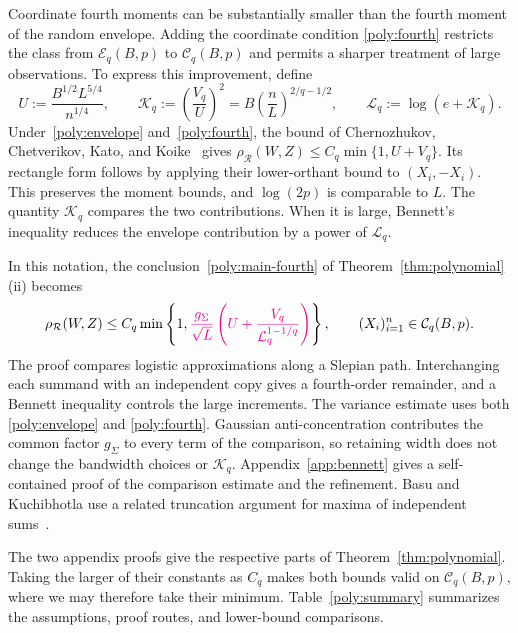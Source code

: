 \documentclass[11pt,letterpaper]{article}
\newenvironment{recovered}{}{}
\newcommand{\vSix}[1]{{\color{magenta}#1}}
\theoremstyle{remark}
\newcommand{\rh}{\rho_{\mathcal R}}
\begin{document}
\begin{recovered}
Coordinate fourth moments can be substantially smaller than the fourth
moment of the random envelope. Adding the coordinate condition
\eqref{poly:fourth} restricts the class from \(\mathcal E_q(B,p)\)
to \(\mathcal C_q(B,p)\) and permits a sharper treatment of large
observations. To express this improvement, define
\end{recovered}
\begin{equation}
 U:=\frac{B^{1/2}L^{5/4}}{n^{1/4}},\qquad
 \mathcal K_q:=\left(\frac{V_q}{U}\right)^2
     =B\left(\frac nL\right)^{2/q-1/2},\qquad
 \mathcal L_q:=\log(e+\mathcal K_q).
 \label{poly:bennett-parameters}
\end{equation}
Under~\eqref{poly:envelope} and~\eqref{poly:fourth}, the bound of
Chernozhukov, Chetverikov, Kato, and
Koike~\cite[Theorem~2.5]{CCKK2022} gives
\(\rh(W,Z)\le C_q\min\{1,U+V_q\}\).
Its rectangle form follows by applying their lower-orthant bound
to \((X_i,-X_i)\). This preserves the moment bounds, and
\(\log(2p)\) is comparable to \(L\).
The quantity \(\mathcal K_q\) compares the two contributions.
When it is large, Bennett's inequality reduces the envelope
contribution by a power of \(\mathcal L_q\).

\begin{recovered}
In this notation, the conclusion~\eqref{poly:main-fourth} of
Theorem~\ref{thm:polynomial}\textup{(ii)} becomes
\begin{equation}
 \rh(W,Z)\le C_q\min\left\{1,
 \vSix{\frac{g_\Sigma}{\sqrt L}
 \left(U+\frac{V_q}{\mathcal L_q^{1-1/q}}\right)}\right\},
 \qquad (X_i)_{i=1}^n\in\mathcal C_q(B,p).
 \label{poly:bennett-bound}
\end{equation}
The proof compares logistic approximations along a Slepian path.
Interchanging each summand with an independent copy gives a
fourth-order remainder, and a Bennett inequality controls the large
increments. The variance estimate uses both \eqref{poly:envelope}
and \eqref{poly:fourth}. \vSix{Gaussian anti-concentration contributes
the common factor \(g_\Sigma\) to every term of the comparison,
so retaining width does not change the bandwidth choices or
\(\mathcal K_q\).} Appendix~\ref{app:bennett} gives a
self-contained proof of the comparison estimate and the refinement.
\end{recovered}
Basu and Kuchibhotla use a related truncation
argument for maxima of independent sums~\cite[Proposition~4.2]{BK2025}.

\begin{recovered}
The two appendix proofs give the respective parts of
Theorem~\ref{thm:polynomial}. Taking the larger of their constants
as \(C_q\) makes both bounds valid on \(\mathcal C_q(B,p)\),
where we may therefore take their minimum. Table~\ref{poly:summary}
summarizes the assumptions, proof routes, and lower-bound comparisons.
\end{recovered}
\end{document}
